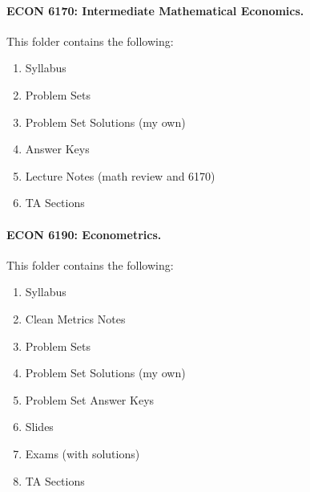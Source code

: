 \documentclass[12pt]{article}
\begin{document}
	
	\paragraph{ECON 6170: Intermediate Mathematical Economics.} This folder contains the following:
	\begin{enumerate}
		\item Syllabus
		\item Problem Sets
		\item Problem Set Solutions (my own)
		\item Answer Keys
		\item Lecture Notes (math review and 6170)
		\item TA Sections
	\end{enumerate}
	
	
	\paragraph{ECON 6190: Econometrics.} This folder contains the following:
	\begin{enumerate}
		\item Syllabus
		\item Clean Metrics Notes
		\item Problem Sets
		\item Problem Set Solutions (my own)
		\item Problem Set Answer Keys
		\item Slides
		\item Exams (with solutions)
		\item TA Sections
	\end{enumerate}
	
	
	
	
	
	
	
	
	
	
	
	
	
	
	
	
	
	
	
	
\end{document}
